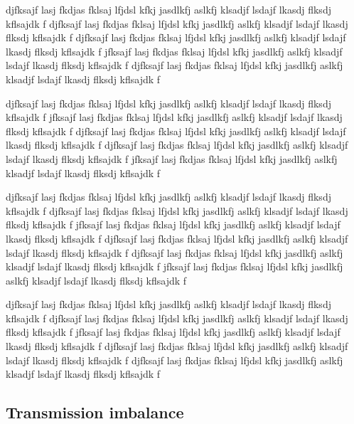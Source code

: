 \documentclass[twocolumn]{../../common/aa}
\begin{document}
djfksajf lasj fkdjas fklsaj lfjdsl kfkj jasdlkfj aslkfj klsadjf lsdajf lkasdj flksdj kflsajdk f
djfksajf lasj fkdjas fklsaj lfjdsl kfkj jasdlkfj aslkfj klsadjf lsdajf lkasdj flksdj kflsajdk f
djfksajf lasj fkdjas fklsaj lfjdsl kfkj jasdlkfj aslkfj klsadjf lsdajf lkasdj flksdj kflsajdk f
jfksajf lasj fkdjas fklsaj lfjdsl kfkj jasdlkfj aslkfj klsadjf lsdajf lkasdj flksdj kflsajdk f
djfksajf lasj fkdjas fklsaj lfjdsl kfkj jasdlkfj aslkfj klsadjf lsdajf lkasdj flksdj kflsajdk f

djfksajf lasj fkdjas fklsaj lfjdsl kfkj jasdlkfj aslkfj klsadjf lsdajf lkasdj flksdj kflsajdk f
jfksajf lasj fkdjas fklsaj lfjdsl kfkj jasdlkfj aslkfj klsadjf lsdajf lkasdj flksdj kflsajdk f
djfksajf lasj fkdjas fklsaj lfjdsl kfkj jasdlkfj aslkfj klsadjf lsdajf lkasdj flksdj kflsajdk f
djfksajf lasj fkdjas fklsaj lfjdsl kfkj jasdlkfj aslkfj klsadjf lsdajf lkasdj flksdj kflsajdk f
jfksajf lasj fkdjas fklsaj lfjdsl kfkj jasdlkfj aslkfj klsadjf lsdajf lkasdj flksdj kflsajdk f

djfksajf lasj fkdjas fklsaj lfjdsl kfkj jasdlkfj aslkfj klsadjf lsdajf lkasdj flksdj kflsajdk f
djfksajf lasj fkdjas fklsaj lfjdsl kfkj jasdlkfj aslkfj klsadjf lsdajf lkasdj flksdj kflsajdk f
jfksajf lasj fkdjas fklsaj lfjdsl kfkj jasdlkfj aslkfj klsadjf lsdajf lkasdj flksdj kflsajdk f
djfksajf lasj fkdjas fklsaj lfjdsl kfkj jasdlkfj aslkfj klsadjf lsdajf lkasdj flksdj kflsajdk f
djfksajf lasj fkdjas fklsaj lfjdsl kfkj jasdlkfj aslkfj klsadjf lsdajf lkasdj flksdj kflsajdk f
jfksajf lasj fkdjas fklsaj lfjdsl kfkj jasdlkfj aslkfj klsadjf lsdajf lkasdj flksdj kflsajdk f

djfksajf lasj fkdjas fklsaj lfjdsl kfkj jasdlkfj aslkfj klsadjf lsdajf lkasdj flksdj kflsajdk f
djfksajf lasj fkdjas fklsaj lfjdsl kfkj jasdlkfj aslkfj klsadjf lsdajf lkasdj flksdj kflsajdk f
jfksajf lasj fkdjas fklsaj lfjdsl kfkj jasdlkfj aslkfj klsadjf lsdajf lkasdj flksdj kflsajdk f
djfksajf lasj fkdjas fklsaj lfjdsl kfkj jasdlkfj aslkfj klsadjf lsdajf lkasdj flksdj kflsajdk f
djfksajf lasj fkdjas fklsaj lfjdsl kfkj jasdlkfj aslkfj klsadjf lsdajf lkasdj flksdj kflsajdk f


\subsection{Transmission imbalance}
\end{document}
